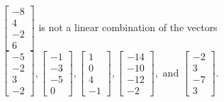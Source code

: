 \begin{exercise}
\begin{exerciseStatement}
  \end{exerciseStatement}
  \begin{exerciseAnswer}
   \(\left[\begin{array}{c}
-8 \\
4 \\
-2 \\
6
\end{array}\right]\) 
  	 is not  
	a linear combination of the vectors \(\left[\begin{array}{c}
-5 \\
-2 \\
3 \\
-2
\end{array}\right] , \left[\begin{array}{c}
-1 \\
-3 \\
-5 \\
0
\end{array}\right] , \left[\begin{array}{c}
1 \\
0 \\
4 \\
-1
\end{array}\right] , \left[\begin{array}{c}
-14 \\
-10 \\
-12 \\
-2
\end{array}\right] , \text{ and } \left[\begin{array}{c}
-2 \\
3 \\
-7 \\
3
\end{array}\right]\).

	
  


  \end{exerciseAnswer}
\end{exercise}